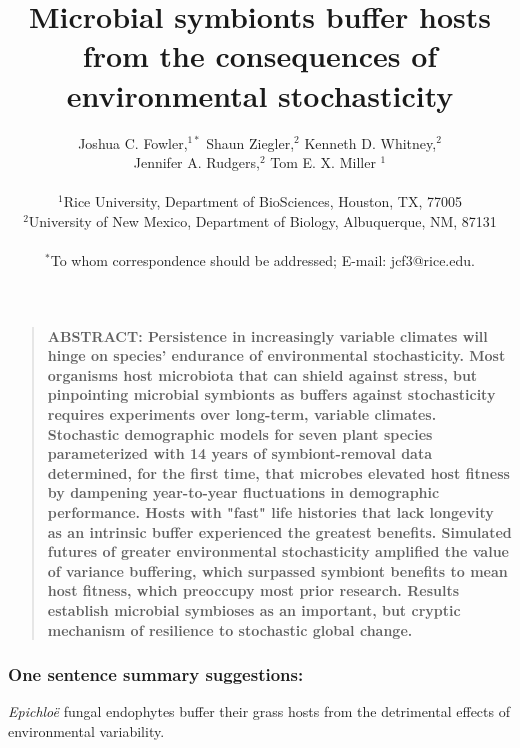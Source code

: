 \documentclass[12pt]{article}
\title{Microbial symbionts buffer hosts from the consequences of environmental stochasticity}
\author
{Joshua C. Fowler,$^{1\ast}$ Shaun Ziegler,$^{2}$ Kenneth D. Whitney,$^{2}$\\
	 Jennifer A. Rudgers,$^{2}$ Tom E. X. Miller $^{1}$\\
\\
\normalsize{$^{1}$Rice University, Department of BioSciences, Houston, TX, 77005}\\
\normalsize{$^{2}$University of New Mexico, Department of Biology, Albuquerque, NM, 87131}\\
\\
\normalsize{$^\ast$To whom correspondence should be addressed; E-mail:  jcf3@rice.edu.}
}
\date{}
\newenvironment{sciabstract}{%
\begin{quote} \bf}
{\end{quote}}
\begin{document}
 


\baselineskip24pt


\maketitle 



\begin{sciabstract}
	ABSTRACT: 
Persistence in increasingly variable climates will hinge on species' endurance of environmental stochasticity.
Most organisms host microbiota that can shield against stress, but pinpointing microbial symbionts as buffers against stochasticity requires experiments over long-term, variable climates. 
Stochastic demographic models for seven plant species parameterized with 14 years of symbiont-removal data determined, for the first time, that microbes elevated host fitness by dampening year-to-year fluctuations in demographic performance. 
Hosts with "fast" life histories that lack longevity as an intrinsic buffer experienced the greatest benefits. 
Simulated futures of greater environmental stochasticity amplified the value of variance buffering, which surpassed symbiont benefits to mean host fitness, which preoccupy most prior research.
Results establish microbial symbioses as an important, but cryptic mechanism of resilience to stochastic global change.

\end{sciabstract}


\subsubsection*{One sentence summary suggestions:}
\emph{Epichloë} fungal endophytes buffer their grass hosts from the detrimental effects of environmental variability.

\end{document}
